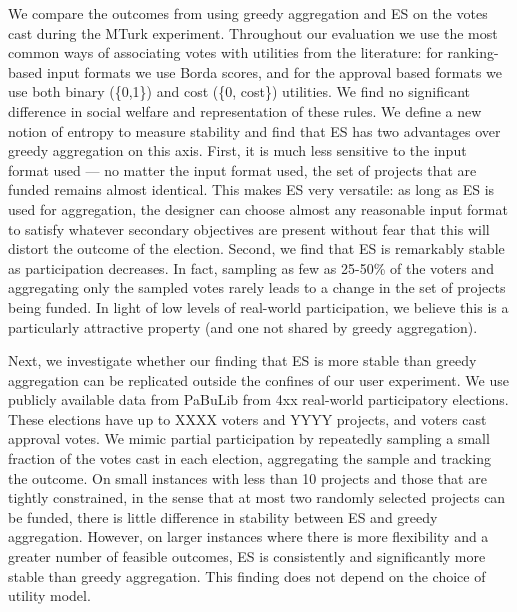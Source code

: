 \documentclass[twoside,11pt]{article}
\newcommand{\mes}{ES}
\newcommand{\pabu}{PaBuLib}
\begin{document}
We compare the outcomes from using greedy aggregation and \mes{} on the votes cast during the MTurk experiment. Throughout our evaluation we use the most common ways of associating votes with utilities from the literature: for   ranking-based input formats we use Borda scores, and for the approval based formats we use both binary (\{0,1\}) and cost (\{0, cost\}) utilities.
We find no significant difference in   social welfare and representation of these rules.  
We define a new notion of entropy to measure stability and    %
 find that \mes{} has two advantages over greedy aggregation on this axis. 
First, it is much less sensitive to the input format used --- no matter the input format used, the set of projects that are funded remains almost identical. This makes \mes{} very versatile: as long as \mes{} is used for aggregation, the designer can choose almost any reasonable input format to satisfy whatever secondary objectives are present without fear that this will distort the outcome of the election. Second, we find that \mes{} is remarkably stable as participation decreases. In fact, sampling as few as 25-50\% of the voters and aggregating only the sampled votes rarely leads to a change in the set of projects being funded. In light of low levels of real-world participation, we believe this is a particularly attractive property (and one  not shared by greedy aggregation).

Next, we investigate whether our finding that \mes{} is more stable than greedy aggregation can be replicated outside the confines of our user experiment. We use publicly available data from \pabu{} from 4xx real-world participatory elections. These elections have up to XXXX voters and YYYY projects, and voters cast approval votes. 
We mimic partial participation by repeatedly sampling a small fraction of the  votes cast in each election, aggregating the sample and tracking the outcome. 
On small instances with less than 10 projects and those that are tightly constrained, in the sense that at most two randomly selected projects can be funded, there is little difference in stability between \mes{} and greedy aggregation. However, on larger instances where there is more flexibility and a greater number of feasible outcomes, \mes{} is consistently and significantly more stable than greedy aggregation. This finding does not depend on the choice of utility model. %
\end{document}
